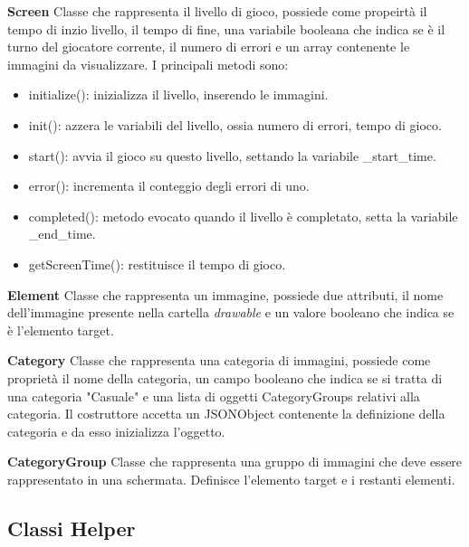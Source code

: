 \begin{description}
\item \textbf{Screen}
Classe che rappresenta il livello di gioco, possiede come propeirt\`{a} il tempo di inzio livello, il tempo di fine, una variabile booleana che indica se \`{e} il turno del giocatore corrente, il numero di errori e un array contenente le immagini da visualizzare. I principali metodi sono:
\begin{itemize}
\item initialize(): inizializza il livello, inserendo le immagini.
\item init(): azzera le variabili del livello, ossia numero di errori, tempo di gioco.
\item start(): avvia il gioco su questo livello, settando la variabile \_start\_time.
\item error(): incrementa il conteggio degli errori di uno.
\item completed(): metodo evocato quando il livello \`{e} completato, setta la variabile \_end\_time.
\item getScreenTime(): restituisce il tempo di gioco.
\end{itemize}
\item \textbf{Element}
\noindent Classe che rappresenta un immagine, possiede due attributi, il nome dell'immagine presente nella cartella \emph{drawable} e un valore booleano che indica se \`{e} l'elemento target.
\item \textbf{Category}
Classe che rappresenta una categoria di immagini, possiede come propriet\`{a} il nome della categoria, un campo booleano che indica se si tratta di una categoria "Casuale" e una lista di oggetti CategoryGroups relativi alla categoria. Il costruttore accetta un JSONObject contenente la definizione della categoria e da esso inizializza l'oggetto.
\item \textbf{CategoryGroup}
Classe che rappresenta una gruppo di immagini che deve essere rappresentato in una schermata. Definisce l'elemento target e i restanti elementi.
\end{description}

\subsection{Classi Helper}

